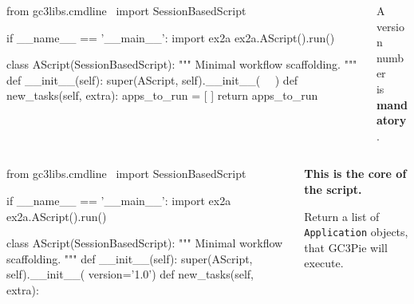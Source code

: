 \documentclass[english,serif,mathserif,xcolor=pdftex,dvipsnames,table]{beamer}
\begin{document}
\begin{frame}[fragile]
  \begin{columns}
    \begin{column}{0.7\linewidth}
\begin{python}
from gc3libs.cmdline \
  import SessionBasedScript

if __name__ == '__main__':
  import ex2a
  ex2a.AScript().run()

class AScript(SessionBasedScript):
  """
  Minimal workflow scaffolding.
  """
  def __init__(self):
    super(AScript, self).__init__(
      ~~)
  def new_tasks(self, extra):
    apps_to_run = [ ]
    return apps_to_run
\end{python}
    \end{column}
    \begin{column}{0.4\linewidth}
      \begin{flushright}
        A version number \\ is \textbf{mandatory}.
      \end{flushright}
    \end{column}
  \end{columns}
\end{frame}


\begin{frame}[fragile]
  \begin{columns}
    \begin{column}{0.7\linewidth}
\begin{python}
from gc3libs.cmdline \
  import SessionBasedScript

if __name__ == '__main__':
  import ex2a
  ex2a.AScript().run()

class AScript(SessionBasedScript):
  """
  Minimal workflow scaffolding.
  """
  def __init__(self):
    super(AScript, self).__init__(
        version='1.0')
  def new_tasks(self, extra):
    ~~
    ~~
\end{python}
    \end{column}
    \begin{column}{0.4\linewidth}
      \begin{flushright}
        \textbf{This is the core of the script.}

        \+
        Return a list of \texttt{Application} objects, that GC3Pie will execute.
      \end{flushright}
    \end{column}
  \end{columns}
\end{frame}
\end{document}

